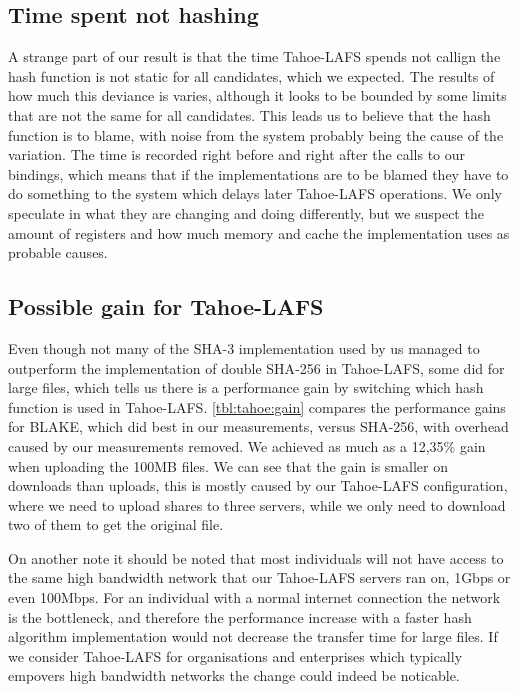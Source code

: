 \documentclass[english,12pt,a4paper]{book}
\begin{document}
\subsection{Time spent not hashing} A strange part of our result is that the
time Tahoe-\ac{LAFS} spends not callign the hash function is not static for all
candidates, which we expected.  The results of how much this deviance is
varies, although it looks to be bounded by some limits that are not the same
for all candidates. This leads us to believe that the hash function is to
blame, with noise from the system probably being the cause of the variation.
The time is recorded right before and right after the calls to our bindings,
which means that if the implementations are to be blamed they have to do
something to the system which delays later Tahoe-{LAFS} operations. We only
speculate in what they are changing and doing differently, but we suspect the
amount of registers and how much memory and cache the implementation uses as
probable causes.

\subsection{Possible gain for Tahoe-LAFS} 

Even though not many of the
\ac{SHA}-3 implementation used by us managed to outperform the implementation
of double \ac{SHA}-256 in Tahoe-\ac{LAFS}, some did for large files, which
tells us there is a performance gain by switching which hash function is used
in Tahoe-LAFS. \autoref{tbl:tahoe:gain} compares the performance gains for
BLAKE, which did best in our measurements, versus \ac{SHA}-256, with overhead
caused by our measurements removed. We achieved as much as a 12,35\% gain when
uploading the 100MB files. We can see that the gain is smaller on downloads
than uploads, this is mostly caused by our Tahoe-\ac{LAFS} configuration, where
we need to upload shares to three servers, while we only need to download two
of them to get the original file.



On another note it should be noted that most individuals will not have access
to the same high bandwidth network that our Tahoe-\ac{LAFS} servers ran on,
1Gbps or even 100Mbps. For an individual with a normal internet connection the
network is the bottleneck, and therefore the performance increase with a faster
hash algorithm implementation would not decrease the transfer time for large
files. If we consider Tahoe-\ac{LAFS} for organisations and enterprises which
typically empovers high bandwidth networks the change could indeed be
noticable. 
\end{document}
